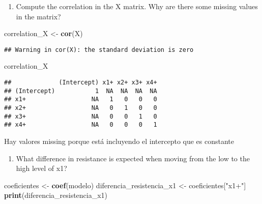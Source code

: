 \documentclass[
]{article}
\newenvironment{Shaded}{\begin{snugshade}}{\end{snugshade}}
\newcommand{\FunctionTok}[1]{\textcolor[rgb]{0.13,0.29,0.53}{\textbf{#1}}}
\newcommand{\NormalTok}[1]{#1}
\newcommand{\OtherTok}[1]{\textcolor[rgb]{0.56,0.35,0.01}{#1}}
\newcommand{\StringTok}[1]{\textcolor[rgb]{0.31,0.60,0.02}{#1}}
\providecommand{\tightlist}{%
  \setlength{\itemsep}{0pt}\setlength{\parskip}{0pt}}
\begin{document}
\begin{enumerate}
\def\labelenumi{(\alph{enumi})}
\setcounter{enumi}{1}
\tightlist
\item
  Compute the correlation in the X matrix. Why are there some missing
  values in the matrix?
\end{enumerate}

\begin{Shaded}
\begin{Highlighting}[]
\NormalTok{correlation\_X }\OtherTok{\textless{}{-}} \FunctionTok{cor}\NormalTok{(X)}
\end{Highlighting}
\end{Shaded}

\begin{verbatim}
## Warning in cor(X): the standard deviation is zero
\end{verbatim}

\begin{Shaded}
\begin{Highlighting}[]
\NormalTok{correlation\_X}
\end{Highlighting}
\end{Shaded}

\begin{verbatim}
##             (Intercept) x1+ x2+ x3+ x4+
## (Intercept)           1  NA  NA  NA  NA
## x1+                  NA   1   0   0   0
## x2+                  NA   0   1   0   0
## x3+                  NA   0   0   1   0
## x4+                  NA   0   0   0   1
\end{verbatim}

Hay valores missing porque está incluyendo el intercepto que es
constante

\begin{enumerate}
\def\labelenumi{(\alph{enumi})}
\setcounter{enumi}{2}
\tightlist
\item
  What difference in resistance is expected when moving from the low to
  the high level of x1?
\end{enumerate}

\begin{Shaded}
\begin{Highlighting}[]
\NormalTok{coeficientes }\OtherTok{\textless{}{-}} \FunctionTok{coef}\NormalTok{(modelo)}
\NormalTok{diferencia\_resistencia\_x1 }\OtherTok{\textless{}{-}}\NormalTok{ coeficientes[}\StringTok{"x1+"}\NormalTok{]}
\FunctionTok{print}\NormalTok{(diferencia\_resistencia\_x1)}
\end{Highlighting}
\end{Shaded}
\end{document}

